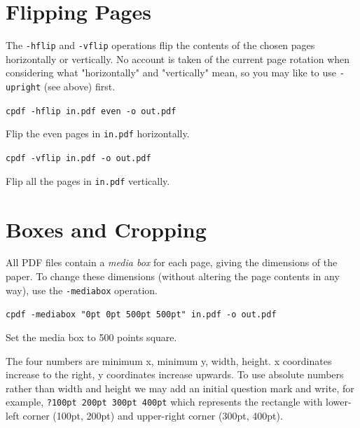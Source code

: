 \documentclass{book}
\begin{document}
  \section{Flipping Pages}
  The \texttt{-hflip} and \texttt{-vflip} operations flip the contents of the
chosen pages horizontally or vertically. No account is taken of the current
page rotation when considering what "horizontally" and "vertically" mean, so you may like to use \texttt{-upright} (see above) first.
  \begin{framed}
    \noindent\small\verb!cpdf -hflip in.pdf even -o out.pdf!

    \vspace{2.5mm}
    \noindent Flip the even pages in \texttt{in.pdf} horizontally.

    \vspace{2.5mm}
    \noindent\verb!cpdf -vflip in.pdf -o out.pdf!

    \vspace{2.5mm}
    \noindent Flip all the pages in \texttt{in.pdf} vertically.
  \end{framed}

  \section{Boxes and Cropping}
  All PDF files contain a \textit{media box} for each page, giving the
dimensions of the paper. To change these dimensions (without altering the page
contents in any way), use the \texttt{-mediabox} operation.
  \begin{framed}
  \noindent\small\verb!cpdf -mediabox "0pt 0pt 500pt 500pt" in.pdf -o out.pdf!

  \vspace{2.5mm}
  \noindent Set the media box to 500 points square.
  \end{framed}
  \noindent The four numbers are minimum x, minimum y, width, height. x
coordinates increase to the right, y coordinates increase upwards. To use absolute numbers rather than width and height we may add an initial question mark and write, for example, \texttt{?100pt 200pt 300pt 400pt} which represents the rectangle with lower-left corner (100pt, 200pt) and upper-right corner (300pt, 400pt).
\end{document}

